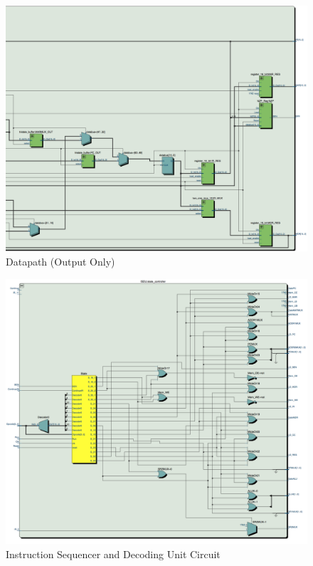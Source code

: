 \documentclass[journal, twocolumn, final,11pt,letterpaper]{IEEEtran}
\begin{document}
\begin{figure} [htbp]
	\centering
	\includegraphics[scale=0.4]{datapath_output_circuit.png}
	\caption{Datapath (Output Only)\label{fig:datapath-circuit-output}}
\end{figure}

\begin{figure} [htbp]
	\centering
	\includegraphics[scale=0.4]{ISDU_Circuit.png}
	\caption{Instruction Sequencer and Decoding Unit Circuit\label{fig:ISDU-circuit}}
\end{figure}
\end{document}
